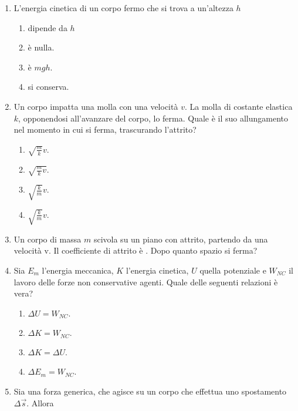 \documentclass{article}
\begin{document}
\begin{enumerate}
\begin{enumerate}[label=\Alph*.]
  \end{enumerate}
  \item L'energia cinetica di un corpo fermo che si trova a un'altezza $h$
  \begin{enumerate}[label=\Alph*.]
    \item dipende da $h$
    \item è nulla.
    \item è $mgh$.
    \item si conserva.
  \end{enumerate}
  \item Un corpo impatta una molla con una velocità $v$. La molla di costante elastica $k$, opponendosi all'avanzare del corpo, lo ferma. Quale è il suo allungamento nel momento in cui si ferma, trascurando l'attrito?
  \begin{enumerate}[label=\Alph*.]
    \item $\sqrt{\frac{m}{k}}v$.
    \item $\sqrt{\frac{m}{k}v}$.
    \item $\sqrt{\frac{k}{m}}v$.
    \item $\sqrt{\frac{k}{m}}v$.
  \end{enumerate}
  \item Un corpo di massa $m$ scivola su un piano con attrito, partendo da una velocità v. Il coefficiente di attrito è \mu. Dopo quanto spazio si ferma?
  \begin{enumerate}[label=\Alph*.]
    \item $\frac{2v^2}{g\mu}}$.
    \item $\frac{1}{2}v^2+\mu g$.
    \item $\frac{v^2}{2g\mu}}$.
    \item $\frac{1}{2}v^2-\mu g$.
  \end{enumerate}
  \item Sia $E_m$ l'energia meccanica, $K$ l'energia cinetica, $U$ quella potenziale e $W_{NC}$ il lavoro delle forze non conservative agenti. Quale delle seguenti relazioni è vera?
  \begin{enumerate}[label=\Alph*.]
    \item $\Delta U=W_{NC}$.
    \item $\Delta K=W_{NC}.$
    \item $\Delta K = \Delta U$.
    \item $\Delta E_m=W_{NC}$.
  \end{enumerate}
  \item Sia  una forza generica, che agisce su un corpo che effettua uno spostamento $\Delta \vec{s}$. Allora

\end{enumerate}
\end{document}
